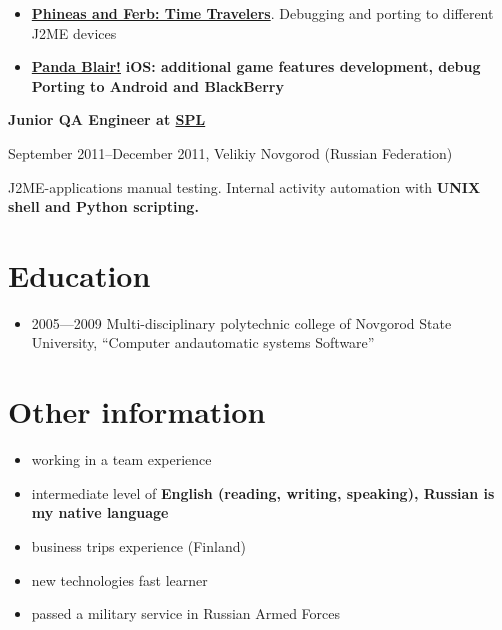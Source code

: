 \begin{itemize}

\setlength{\itemindent}{20pt}
\item
    \href{http://java.mob.org/game/phineas\_and\_ferb\_time\_travelers.html}
        {\bfseries Phineas and Ferb: Time Travelers\mdseries}.
        Debugging and porting to different J2ME devices
\item
    \href{https://itunes.apple.com/us/app/panda-blair!/id500995558?mt=8}
        {\bfseries Panda Blair!\mdseries}
        \bfseries iOS\mdseries: additional game features development, debug
        Porting to \bfseries Android \mdseries and \bfseries BlackBerry\mdseries
\end{itemize}

\vspace{5pt}

{
\fontsize{12pt}{12pt}\selectfont
\bfseries Junior QA Engineer at
\href{http://spl.co}{\bfseries SPL\mdseries}
\mdseries
}

{
\fontsize{9pt}{8pt}\selectfont
September 2011--December 2011, Velikiy Novgorod (Russian Federation)
}

J2ME-applications manual testing. Internal activity automation with
\bfseries UNIX shell \mdseries and \bfseries Python \mdseries scripting.

\section{Education}
\begin{itemize}
\item 2005---2009 Multi-disciplinary polytechnic college of
Novgorod State University,
``Computer and\linebreak automatic systems Software''
\end{itemize}

\section{Other information}
\begin{itemize}
\item working in a team experience
\item intermediate level of \bfseries English \mdseries (reading, writing, speaking),
Russian is my native language
\item business trips experience (Finland)
\item new technologies fast learner
\item passed a military service in Russian Armed Forces
\end{itemize}


